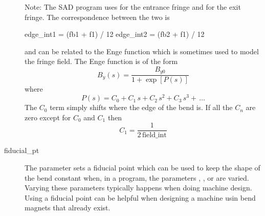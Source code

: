 \begin{description}
Note: The SAD program uses  for the entrance fringe and  for the exit
fringe. The correspondence between the two is
\begin{example2}
  edge_int1 = (fb1 + f1) / 12
  edge_int2 = (fb2 + f1) / 12
\end{example2}

 and  can be related to the Enge function which is sometimes used to model the
fringe field. The Enge function is of the form
\begin{equation}
  B_y(s) = \frac{B_{y0}}{1 + \exp[P(s)]}
\end{equation}
where
\begin{equation}
  P(s) = C_0 + C_1 \, s + C_2 \, s^2 + C_3 \, s^3 + \, \ldots
\end{equation}
The $C_0$ term simply shifts where the edge of the bend is. If all the $C_n$ are zero except for
$C_0$ and $C_1$ then
\begin{equation}
  C_1 = \frac{1}{2 \, \text{field_int}}
\end{equation}
  \item[fiducial_pt] \Newline
The  parameter sets a fiducial point which can be used to keep the shape of the bend
constant when, in a program, the parameters , ,  or  are varied.
Varying these parameters typically happens when doing machine design. Using a fiducial point can be
helpful when designing a machine usin bend magnets that already exist.


\end{description}
